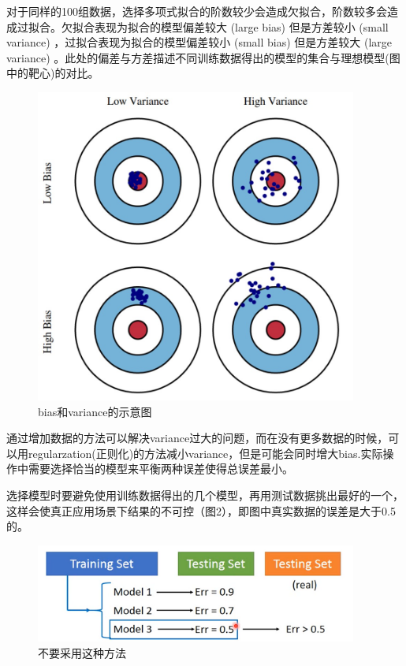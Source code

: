 \documentclass[UTF8,a4paper]{ctexart}
\begin{document}
对于同样的100组数据，选择多项式拟合的阶数较少会造成欠拟合，阶数较多会造成过拟合。欠拟合表现为拟合的模型偏差较大 (large bias) 但是方差较小 (small variance) ，过拟合表现为拟合的模型偏差较小 (small bias) 但是方差较大 (large variance) 。此处的偏差与方差描述不同训练数据得出的模型的集合与理想模型(图中的靶心)的对比。
\begin{figure}[ht]
\centering
\includegraphics[width=300pt]{bias-variance.png}
\caption{bias和variance的示意图}
\end{figure}

通过增加数据的方法可以解决variance过大的问题，而在没有更多数据的时候，可以用regularzation(正则化)的方法减小variance，但是可能会同时增大bias.实际操作中需要选择恰当的模型来平衡两种误差使得总误差最小。

选择模型时要避免使用训练数据得出的几个模型，再用测试数据挑出最好的一个，这样会使真正应用场景下结果的不可控（图2），即图中真实数据的误差是大于0.5的。

\newpage

\begin{figure}[ht]
\centering
\includegraphics[width=300pt]{notdo.png}
\caption{不要采用这种方法}
\end{figure}
\end{document}

